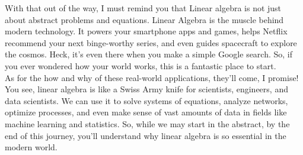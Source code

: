 With that out of the way, I must remind you that Linear algebra is not just about abstract problems and equations. Linear Algebra is the muscle behind modern technology. It powers your smartphone apps and games, helps Netflix recommend your next binge-worthy series, and even guides spacecraft to explore the cosmos. Heck, it's even there when you make a simple Google search. So, if you ever wondered how your world works, this is a fantastic place to start.\\
As for the how and why of these real-world applications, they'll come, I promise! You see, linear algebra is like a Swiss Army knife for scientists, engineers, and data scientists. We can use it to solve systems of equations, analyze networks, optimize processes, and even make sense of vast amounts of data in fields like machine learning and statistics. So, while we may start in the abstract, by the end of this journey, you'll understand why linear algebra is so essential in the modern world.\\

